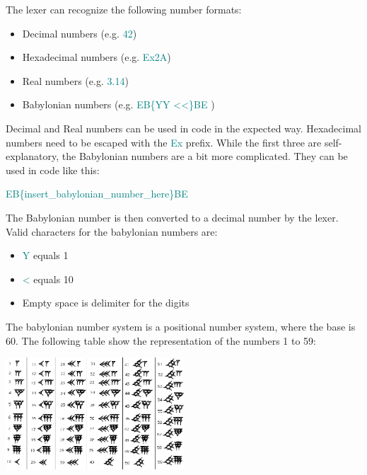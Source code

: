 The lexer can recognize the following number formats:
\begin{itemize}[noitemsep]
    \item Decimal numbers (e.g. \textcolor{teal}{42}) 
    \item Hexadecimal numbers (e.g. \textcolor{teal}{Ex2A})
    \item Real numbers (e.g. \textcolor{teal}{3.14})
    \item Babylonian numbers (e.g. \textcolor{teal}{ EB\{YY \textless{\textless}\}BE })
\end{itemize}
\noindent
Decimal and Real numbers can be used in code in the expected way. Hexadecimal numbers
need to be escaped with the \textcolor{teal}{Ex} prefix.\newline
While the first three are self-explanatory, the Babylonian numbers are a bit more complicated.
They can be used in code like this: 
\begin{center}
    \textcolor{teal}{ EB\{insert\_babylonian\_number\_here\}BE }
\end{center}
\noindent
The Babylonian number is then converted to a decimal number by the lexer.
Valid characters for the babylonian numbers are:
\begin{itemize}[noitemsep]
    \item \textcolor{teal}{Y} equals 1
    \item \textcolor{teal}{\textless} equals 10
    \item Empty space is delimiter for the digits
\end{itemize}
\noindent
The babylonian number system is a positional number system, where the base is 60.
The following table show the representation of the numbers 1 to 59:
\begin{center}
    \includegraphics[width=0.5\textwidth]{babylonian_numbers.png}
    \cite{Babylonian}
\end{center}
\noindent







